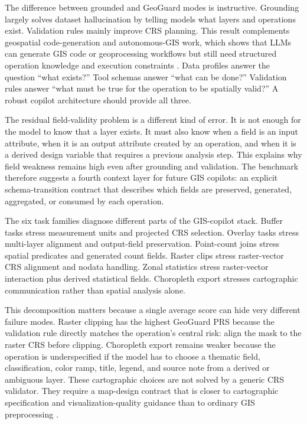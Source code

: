 \documentclass[12pt]{gsis}  %
\begin{document}
The difference between grounded and GeoGuard modes is instructive. Grounding largely solves dataset hallucination by telling models what layers and operations exist. Validation rules mainly improve CRS planning. This result complements geospatial code-generation and autonomous-GIS work, which shows that LLMs can generate GIS code or geoprocessing workflows but still need structured operation knowledge and execution constraints \citep{Hou_2025_GeoCode,Hou_2025_GEEOPs,Li_2025_AutonomousGIS}. Data profiles answer the question ``what exists?'' Tool schemas answer ``what can be done?'' Validation rules answer ``what must be true for the operation to be spatially valid?'' A robust copilot architecture should provide all three.

The residual field-validity problem is a different kind of error. It is not enough for the model to know that a layer exists. It must also know when a field is an input attribute, when it is an output attribute created by an operation, and when it is a derived design variable that requires a previous analysis step. This explains why field weakness remains high even after grounding and validation. The benchmark therefore suggests a fourth context layer for future GIS copilots: an explicit schema-transition contract that describes which fields are preserved, generated, aggregated, or consumed by each operation.

The six task families diagnose different parts of the GIS-copilot stack. Buffer tasks stress measurement units and projected CRS selection. Overlay tasks stress multi-layer alignment and output-field preservation. Point-count joins stress spatial predicates and generated count fields. Raster clips stress raster-vector CRS alignment and nodata handling. Zonal statistics stress raster-vector interaction plus derived statistical fields. Choropleth export stresses cartographic communication rather than spatial analysis alone.

This decomposition matters because a single average score can hide very different failure modes. Raster clipping has the highest GeoGuard PRS because the validation rule directly matches the operation's central risk: align the mask to the raster CRS before clipping. Choropleth export remains weaker because the operation is underspecified if the model has to choose a thematic field, classification, color ramp, title, legend, and source note from a derived or ambiguous layer. These cartographic choices are not solved by a generic CRS validator. They require a map-design contract that is closer to cartographic specification and visualization-quality guidance than to ordinary GIS preprocessing \citep{Roth_2013,Roth_2015,Kang_2024,Munzner_2009}.
\end{document}
